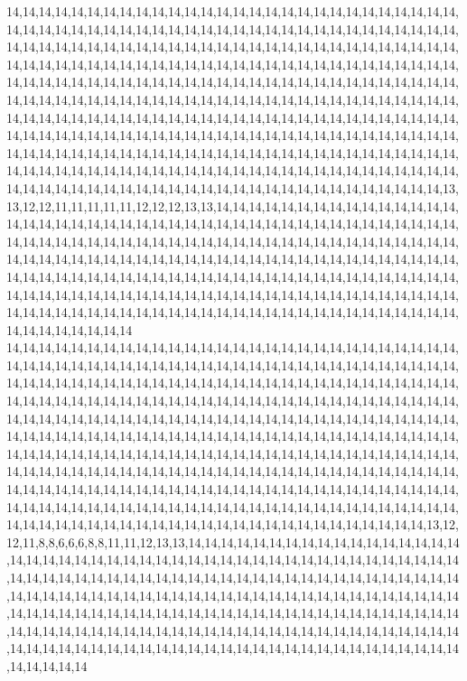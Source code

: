 14,14,14,14,14,14,14,14,14,14,14,14,14,14,14,14,14,14,14,14,14,14,14,14,14,14,14,14,14,14,14,14,14,14,14,14,14,14,14,14,14,14,14,14,14,14,14,14,14,14,14,14,14,14,14,14,14,14,14,14,14,14,14,14,14,14,14,14,14,14,14,14,14,14,14,14,14,14,14,14,14,14,14,14,14,14,14,14,14,14,14,14,14,14,14,14,14,14,14,14,14,14,14,14,14,14,14,14,14,14,14,14,14,14,14,14,14,14,14,14,14,14,14,14,14,14,14,14,14,14,14,14,14,14,14,14,14,14,14,14,14,14,14,14,14,14,14,14,14,14,14,14,14,14,14,14,14,14,14,14,14,14,14,14,14,14,14,14,14,14,14,14,14,14,14,14,14,14,14,14,14,14,14,14,14,14,14,14,14,14,14,14,14,14,14,14,14,14,14,14,14,14,14,14,14,14,14,14,14,14,14,14,14,14,14,14,14,14,14,14,14,14,14,14,14,14,14,14,14,14,14,14,14,14,14,14,14,14,14,14,14,14,14,14,14,14,14,14,14,14,14,14,14,14,14,14,14,14,14,14,14,14,14,14,14,14,14,14,14,14,14,14,14,14,14,14,14,14,14,14,14,14,14,14,14,14,14,14,14,14,14,14,14,14,14,14,14,14,14,14,14,14,14,14,14,14,14,13,13,12,12,11,11,11,11,11,12,12,12,13,13,14,14,14,14,14,14,14,14,14,14,14,14,14,14,14,14,14,14,14,14,14,14,14,14,14,14,14,14,14,14,14,14,14,14,14,14,14,14,14,14,14,14,14,14,14,14,14,14,14,14,14,14,14,14,14,14,14,14,14,14,14,14,14,14,14,14,14,14,14,14,14,14,14,14,14,14,14,14,14,14,14,14,14,14,14,14,14,14,14,14,14,14,14,14,14,14,14,14,14,14,14,14,14,14,14,14,14,14,14,14,14,14,14,14,14,14,14,14,14,14,14,14,14,14,14,14,14,14,14,14,14,14,14,14,14,14,14,14,14,14,14,14,14,14,14,14,14,14,14,14,14,14,14,14,14,14,14,14,14,14,14,14,14,14,14,14,14,14,14,14,14,14,14,14,14,14,14,14,14,14,14,14,14,14,14,14,14,14,14,14,14
14,14,14,14,14,14,14,14,14,14,14,14,14,14,14,14,14,14,14,14,14,14,14,14,14,14,14,14,14,14,14,14,14,14,14,14,14,14,14,14,14,14,14,14,14,14,14,14,14,14,14,14,14,14,14,14,14,14,14,14,14,14,14,14,14,14,14,14,14,14,14,14,14,14,14,14,14,14,14,14,14,14,14,14,14,14,14,14,14,14,14,14,14,14,14,14,14,14,14,14,14,14,14,14,14,14,14,14,14,14,14,14,14,14,14,14,14,14,14,14,14,14,14,14,14,14,14,14,14,14,14,14,14,14,14,14,14,14,14,14,14,14,14,14,14,14,14,14,14,14,14,14,14,14,14,14,14,14,14,14,14,14,14,14,14,14,14,14,14,14,14,14,14,14,14,14,14,14,14,14,14,14,14,14,14,14,14,14,14,14,14,14,14,14,14,14,14,14,14,14,14,14,14,14,14,14,14,14,14,14,14,14,14,14,14,14,14,14,14,14,14,14,14,14,14,14,14,14,14,14,14,14,14,14,14,14,14,14,14,14,14,14,14,14,14,14,14,14,14,14,14,14,14,14,14,14,14,14,14,14,14,14,14,14,14,14,14,14,14,14,14,14,14,14,14,14,14,14,14,14,14,14,14,14,14,14,14,14,14,14,14,14,14,14,14,14,14,14,14,14,14,14,14,14,14,14,13,12,12,11,8,8,6,6,6,8,8,11,11,12,13,13,14,14,14,14,14,14,14,14,14,14,14,14,14,14,14,14,14,14,14,14,14,14,14,14,14,14,14,14,14,14,14,14,14,14,14,14,14,14,14,14,14,14,14,14,14,14,14,14,14,14,14,14,14,14,14,14,14,14,14,14,14,14,14,14,14,14,14,14,14,14,14,14,14,14,14,14,14,14,14,14,14,14,14,14,14,14,14,14,14,14,14,14,14,14,14,14,14,14,14,14,14,14,14,14,14,14,14,14,14,14,14,14,14,14,14,14,14,14,14,14,14,14,14,14,14,14,14,14,14,14,14,14,14,14,14,14,14,14,14,14,14,14,14,14,14,14,14,14,14,14,14,14,14,14,14,14,14,14,14,14,14,14,14,14,14,14,14,14,14,14,14,14,14,14,14,14,14,14,14,14,14,14,14,14,14,14,14,14,14,14
